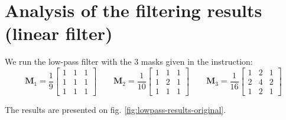 \documentclass[12pt]{article}
\begin{document}
\section{Analysis of the filtering results (linear filter)}

We run the low-pass filter with the 3 masks given in the instruction:
\begin{equation*}
    \mathbf{M}_1 = \frac{1}{9}\begin{bmatrix}
        1 & 1 & 1 \\
        1 & 1 & 1 \\
        1 & 1 & 1
    \end{bmatrix}
    \qquad
    \mathbf{M}_2 = \frac{1}{10}\begin{bmatrix}
        1 & 1 & 1 \\
        1 & 2 & 1 \\
        1 & 1 & 1
    \end{bmatrix}
    \qquad
    \mathbf{M}_3 = \frac{1}{16}\begin{bmatrix}
        1 & 2 & 1 \\
        2 & 4 & 2 \\
        1 & 2 & 1
    \end{bmatrix}
\end{equation*}

The results are presented on fig. \ref{fig:lowpass-results-original}.
\end{document}

